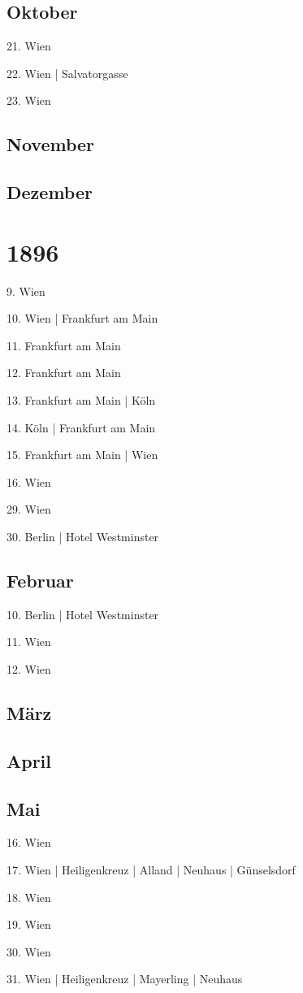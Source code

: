 \documentclass[twoside=false,titlepage=false,open=any, parskip=never, fontsize=10pt, headings=small, chapterprefix=false, appendixprefix=false, DIV=15]{scrbook}
\begin{document}
\begin{multicols}{3}
            \section*{Oktober}
            21. Wien\par
            22. Wien | Salvatorgasse\par
            23. Wien\par
            \section*{November}
            \section*{Dezember}
            \chapter*{1896}
            9. Wien\par
            10. Wien | Frankfurt am Main\par
            11. Frankfurt am Main\par
            12. Frankfurt am Main\par
            13. Frankfurt am Main | Köln\par
            14. Köln | Frankfurt am Main\par
            15. Frankfurt am Main | Wien\par
            16. Wien\par
            29. Wien\par
            30. Berlin | Hotel Westminster\par
            \section*{Februar}
            10. Berlin | Hotel Westminster\par
            11. Wien\par
            12. Wien\par
            \section*{März}
            \section*{April}
            \section*{Mai}
            16. Wien\par
            17. Wien | Heiligenkreuz | Alland | Neuhaus | Günselsdorf\par
            18. Wien\par
            19. Wien\par
            30. Wien\par
            31. Wien | Heiligenkreuz | Mayerling | Neuhaus\par

\end{multicols}
\end{document}
